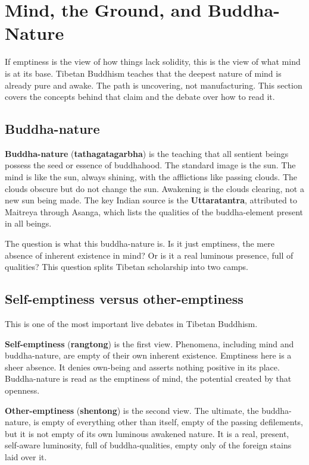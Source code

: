 \section{Mind, the Ground, and Buddha-Nature}

If emptiness is the view of how things lack solidity, this is the view of what mind is at its base. Tibetan Buddhism teaches that the deepest nature of mind is already pure and awake. The path is uncovering, not manufacturing. This section covers the concepts behind that claim and the debate over how to read it.

\subsection*{Buddha-nature}

\textbf{Buddha-nature} (\textbf{tathagatagarbha}) is the teaching that all sentient beings possess the seed or essence of buddhahood. The standard image is the sun. The mind is like the sun, always shining, with the afflictions like passing clouds. The clouds obscure but do not change the sun. Awakening is the clouds clearing, not a new sun being made. The key Indian source is the \textbf{Uttaratantra}, attributed to Maitreya through Asanga, which lists the qualities of the buddha-element present in all beings.

The question is what this buddha-nature is. Is it just emptiness, the mere absence of inherent existence in mind? Or is it a real luminous presence, full of qualities? This question splits Tibetan scholarship into two camps.

\subsection*{Self-emptiness versus other-emptiness}

This is one of the most important live debates in Tibetan Buddhism.

\textbf{Self-emptiness} (\textbf{rangtong}) is the first view. Phenomena, including mind and buddha-nature, are empty of their own inherent existence. Emptiness here is a sheer absence. It denies own-being and asserts nothing positive in its place. Buddha-nature is read as the emptiness of mind, the potential created by that openness.

\textbf{Other-emptiness} (\textbf{shentong}) is the second view. The ultimate, the buddha-nature, is empty of everything other than itself, empty of the passing defilements, but it is not empty of its own luminous awakened nature. It is a real, present, self-aware luminosity, full of buddha-qualities, empty only of the foreign stains laid over it.

